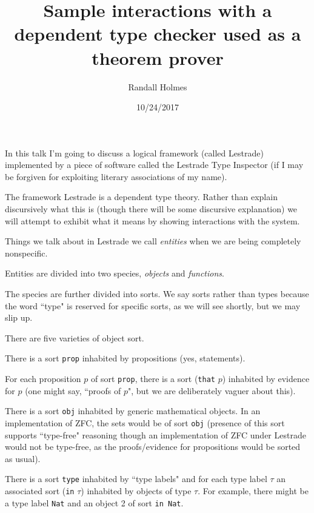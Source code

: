 \documentclass[12pt]{slides}
\title{Sample interactions with a dependent type checker used as a theorem prover}
\author{Randall Holmes}
\date{10/24/2017}
\begin{document}
\begin{slide}

\maketitle

\end{slide}

\begin{slide}

In this talk I'm going to discuss a logical framework (called Lestrade) implemented by a piece of software called the Lestrade Type Inspector (if I may be forgiven for exploiting literary associations of my name).

The framework Lestrade is a dependent type theory.  Rather than explain discursively what this is (though there will be some discursive explanation) we will attempt to exhibit what it means by showing interactions with the system.

\end{slide}

\begin{slide}

Things we talk about in Lestrade we call {\em entities\/} when we are being completely nonspecific.

Entities are divided into two species, {\em objects\/} and {\em functions\/}.

The species are further divided into sorts.  We say sorts rather than types because the word ``type" is reserved for specific sorts, as we will see shortly, but we may slip up.


\end{slide}

\begin{slide}

There are five varieties of object sort.

There is a sort {\tt prop} inhabited by propositions (yes, statements).

For each proposition $p$ of sort {\tt prop}, there is a sort ({\tt that} $p$) inhabited by evidence for $p$ (one might say, ``proofs of $p$", but we are deliberately vaguer about this).

There is a sort {\tt obj} inhabited by generic mathematical objects.  In an implementation of ZFC, the sets would be of sort {\tt obj} (presence of this sort supports ``type-free" reasoning though an implementation of ZFC under Lestrade would not be type-free, as the proofs/evidence for propositions would be sorted as usual).

There is a sort {\tt type} inhabited by ``type labels" and for each type label $\tau$ an associated sort ({\tt in} $\tau$) inhabited by objects of type $\tau$.
For example, there might be a type label {\tt Nat} and an object 2 of sort {\tt in Nat}.


\end{slide}
\end{document}
